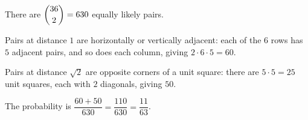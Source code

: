 There are $\dbinom{36}{2}=630$ equally likely pairs.

Pairs at distance $1$ are horizontally or vertically adjacent: each of the $6$ rows has $5$ adjacent pairs, and so does each column, giving $2\cdot6\cdot5=60$.

Pairs at distance $\sqrt2$ are opposite corners of a unit square: there are $5\cdot5=25$ unit squares, each with $2$ diagonals, giving $50$.

The probability is $\dfrac{60+50}{630}=\dfrac{110}{630}=\boxed{\dfrac{11}{63}}$.
